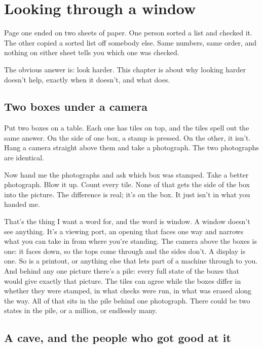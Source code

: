 \documentclass[11pt,twoside]{article}
\theoremstyle{thielethm}
\theoremstyle{thieledef}
\theoremstyle{thieledef}
\theoremstyle{thieledef}
\theoremstyle{thielethm}
\theoremstyle{thieleobs}
\theoremstyle{thielethm}
\begin{document}
\section{Looking through a window}
\label{sec:window}

Page one ended on two sheets of paper. One person sorted a list and checked it. The other copied a sorted list off somebody else. Same numbers, same order, and nothing on either sheet tells you which one was checked.

The obvious answer is: look harder. This chapter is about why looking harder doesn't help, exactly when it doesn't, and what does.

\subsection{Two boxes under a camera}

Put two boxes on a table. Each one has tiles on top, and the tiles spell out the same answer. On the side of one box, a stamp is pressed. On the other, it isn't. Hang a camera straight above them and take a photograph. The two photographs are identical.

Now hand me the photographs and ask which box was stamped. Take a better photograph. Blow it up. Count every tile. None of that gets the side of the box into the picture. The difference is real; it's on the box. It just isn't in what you handed me.

That's the thing I want a word for, and the word is window. A window doesn't see anything. It's a viewing port, an opening that faces one way and narrows what you can take in from where you're standing. The camera above the boxes is one: it faces down, so the tops come through and the sides don't. A display is one. So is a printout, or anything else that lets part of a machine through to you. And behind any one picture there's a pile: every full state of the boxes that would give exactly that picture. The tiles can agree while the boxes differ in whether they were stamped, in what checks were run, in what was erased along the way. All of that sits in the pile behind one photograph. There could be two states in the pile, or a million, or endlessly many.

\subsection{A cave, and the people who got good at it}
\end{document}
